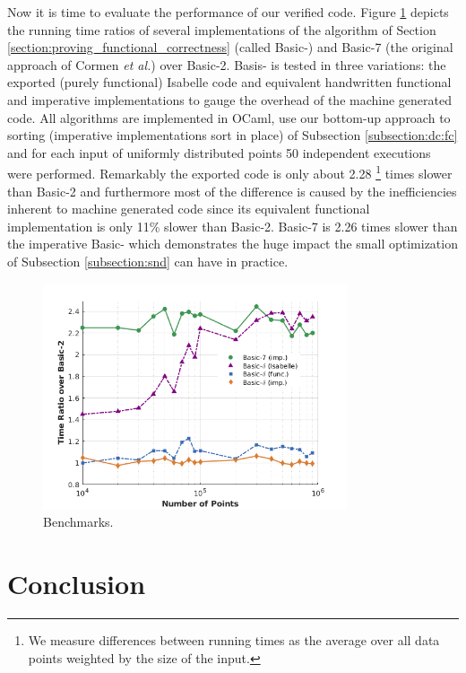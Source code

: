 \begin{isabellebody}
\begin{isamarkuptext}
Now it is time to evaluate the performance of our verified code.
Figure \ref{fig:benchmark} depicts the running time ratios of several implementations of the algorithm
of Section \ref{section:proving_functional_correctness} (called Basic-\isa{{\isasymdelta}}) and Basic-7 (the original
approach of Cormen \emph{et al.}) over Basic-2. Basis-\isa{{\isasymdelta}} is tested in three variations: the exported
(purely functional) Isabelle code and equivalent handwritten functional and imperative implementations
to gauge the overhead of the machine generated code. All algorithms are implemented in OCaml, use our
bottom-up approach to sorting (imperative implementations sort in place) of Subsection \ref{subsection:dc:fc}
and for each input of uniformly distributed points 50 independent executions were performed.
Remarkably the exported code is only about 2.28 \footnote{We measure differences between
running times as the average over all data points weighted by the size of the input.}
times slower than Basic-2 and furthermore most of the difference is caused by the inefficiencies
inherent to machine generated code since its equivalent functional implementation is only 11\%
slower than Basic-2. Basic-7 is 2.26 times slower than the imperative Basic-\isa{{\isasymdelta}} which demonstrates
the huge impact the small optimization of Subsection \ref{subsection:snd} can have in practice.
%
\begin{figure}[htpb]
\centering
\includegraphics[width=0.8\textwidth]{./Benchmarks2.png}
\caption[]{Benchmarks.}
\label{fig:benchmark}
\end{figure}
%
\section{Conclusion} \label{section:conclusion}


\end{isamarkuptext}
\end{isabellebody}
